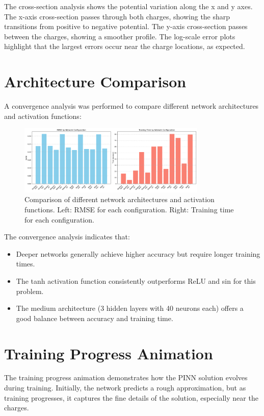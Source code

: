 \documentclass[12pt,a4paper]{report}
\begin{document}
	The cross-section analysis shows the potential variation along the x and y axes. The x-axis cross-section passes through both charges, showing the sharp transitions from positive to negative potential. The y-axis cross-section passes between the charges, showing a smoother profile. The log-scale error plots highlight that the largest errors occur near the charge locations, as expected.
	
	\section{Architecture Comparison}
	A convergence analysis was performed to compare different network architectures and activation functions:
	
	\begin{figure}[H]
		\centering
		\includegraphics[width=0.8\textwidth]{convergence_analysis.png}
		\caption{Comparison of different network architectures and activation functions. Left: RMSE for each configuration. Right: Training time for each configuration.}
	\end{figure}
	
	The convergence analysis indicates that:
	\begin{itemize}
		\item Deeper networks generally achieve higher accuracy but require longer training times.
		\item The tanh activation function consistently outperforms ReLU and sin for this problem.
		\item The medium architecture (3 hidden layers with 40 neurons each) offers a good balance between accuracy and training time.
	\end{itemize}
	
	\section{Training Progress Animation}
	
	The training progress animation demonstrates how the PINN solution evolves during training. Initially, the network predicts a rough approximation, but as training progresses, it captures the fine details of the solution, especially near the charges.
	
\end{document}
